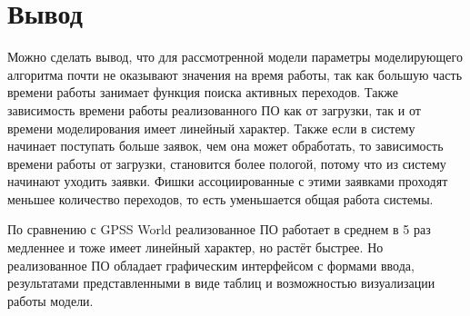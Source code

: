 \section{Вывод}

Можно сделать вывод, что для рассмотренной модели параметры моделирующего алгоритма почти не оказывают значения на время работы, так как большую часть времени работы занимает функция поиска активных переходов. Также зависимость времени работы реализованного ПО как от загрузки, так и от времени моделирования имеет линейный характер. Также если в систему начинает поступать больше заявок, чем она может обработать, то зависимость времени работы от загрузки, становится  более пологой, потому что из систему начинают уходить заявки. Фишки ассоциированные с этими заявками проходят меньшее количество переходов, то есть уменьшается общая работа системы.

По сравнению с GPSS World реализованное ПО работает в среднем в 5 раз медленнее и тоже имеет линейный характер, но растёт быстрее. Но реализованное ПО обладает графическим интерфейсом с формами ввода, результатами представленными в виде таблиц и возможностью визуализации работы модели.